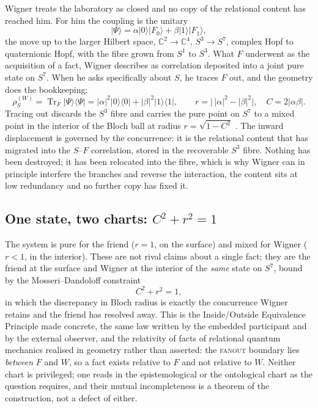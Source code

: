 Wigner treats the laboratory as closed and no copy of the relational content has
reached him. For him the coupling is the unitary
\begin{equation}
  \lvert\Psi\rangle
  =\alpha\lvert 0\rangle\lvert F_{0}\rangle
  +\beta\lvert 1\rangle\lvert F_{1}\rangle,
\end{equation}
the move up to the larger Hilbert space, $\mathbb{C}^{2}\to\mathbb{C}^{4}$,
$S^{3}\to S^{7}$, complex Hopf to quaternionic Hopf, with the fibre grown from
$S^{1}$ to $S^{3}$. What $F$ underwent as the acquisition of a fact, Wigner
describes as correlation deposited into a joint pure state on $S^{7}$. When he
asks specifically about $S$, he traces $F$ out, and the geometry does the
bookkeeping:
\begin{equation}
  \rho_{S}^{(W)}=\operatorname{Tr}_{F}\lvert\Psi\rangle\langle\Psi\rvert
  =\lvert\alpha\rvert^{2}\lvert 0\rangle\langle 0\rvert
  +\lvert\beta\rvert^{2}\lvert 1\rangle\langle 1\rvert,
  \qquad
  r=\bigl\lvert\,\lvert\alpha\rvert^{2}-\lvert\beta\rvert^{2}\bigr\rvert,
  \quad
  C=2\lvert\alpha\beta\rvert .
\end{equation}
Tracing out discards the $S^{3}$ fibre and carries the pure point on $S^{7}$ to a
mixed point in the interior of the Bloch ball at radius $r=\sqrt{1-C^{2}}$
\autocite{MosseriDandoloff2001}. The inward displacement is governed by the
concurrence: it is the relational content that has migrated into the $S$--$F$
correlation, stored in the recoverable $S^{3}$ fibre. Nothing has been destroyed;
it has been relocated into the fibre, which is why Wigner can in principle
interfere the branches and reverse the interaction, the content sits at low
redundancy and no further copy has fixed it.

\subsection{One state, two charts: \texorpdfstring{$C^{2}+r^{2}=1$}{C2+r2=1}}
\label{sec:wf-reconciliation}

The system is pure for the friend ($r=1$, on the surface) and mixed for Wigner
($r<1$, in the interior). These are not rival claims about a single fact; they are
the friend at the surface and Wigner at the interior of the \emph{same} state on
$S^{7}$, bound by the Mosseri--Dandoloff constraint
\begin{equation}
  C^{2}+r^{2}=1,
\end{equation}
in which the discrepancy in Bloch radius is exactly the concurrence Wigner
retains and the friend has resolved away. This is the Inside/Outside Equivalence
Principle made concrete, the same law written by the embedded participant and by
the external observer, and the relativity of facts of relational quantum
mechanics \autocite{Rovelli1996a} realised in geometry rather than asserted: the
\textsc{fanout} boundary lies \emph{between} $F$ and $W$, so a fact exists
relative to $F$ and not relative to $W$. Neither chart is privileged; one reads in
the epistemological or the ontological chart as the question requires, and their
mutual incompleteness is a theorem of the construction, not a defect of either.

